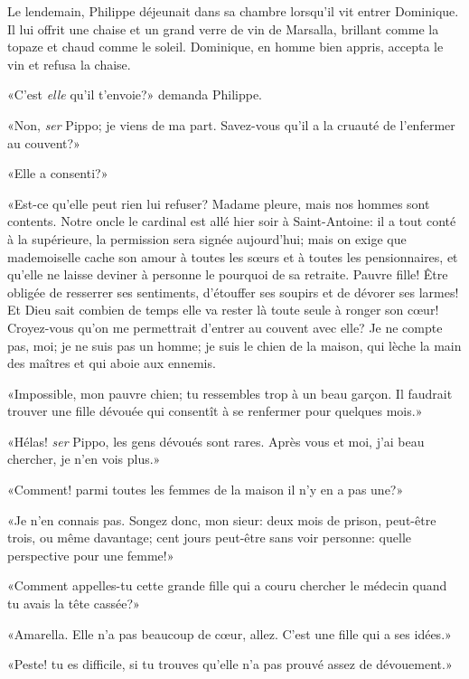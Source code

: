 Le lendemain, Philippe déjeunait dans sa chambre lorsqu'il vit entrer Dominique. Il lui offrit une chaise et un grand verre de vin de Marsalla, brillant comme la topaze et chaud comme le soleil. Dominique, en homme bien appris, accepta le vin et refusa la chaise.

«C'est \emph{elle} qu'il t'envoie?» demanda Philippe.

«Non, \emph{ser} Pippo; je viens de ma part. Savez-vous qu'il a la cruauté de l'enfermer au couvent?»

«Elle a consenti?»

«Est-ce qu'elle peut rien lui refuser? Madame pleure, mais nos hommes sont contents. Notre oncle le cardinal est allé hier soir à Saint-Antoine: il a tout conté à la supérieure, la permission sera signée aujourd'hui; mais on exige que mademoiselle cache son amour à toutes les s\oe{}urs et à toutes les pensionnaires, et qu'elle ne laisse deviner à personne le pourquoi de sa retraite. Pauvre fille! Être obligée de resserrer ses sentiments, d'étouffer ses soupirs et de dévorer ses larmes! Et Dieu sait combien de temps elle va rester là toute seule à ronger son c\oe{}ur! Croyez-vous qu'on me permettrait d'entrer au couvent avec elle? Je ne compte pas, moi; je ne suis pas un homme; je suis le chien de la maison, qui lèche la main des maîtres et qui aboie aux ennemis.

«Impossible, mon pauvre chien; tu ressembles trop à un beau garçon. Il faudrait trouver une fille dévouée qui consentît à se renfermer pour quelques mois.»

«Hélas! \emph{ser} Pippo, les gens dévoués sont rares. Après vous et moi, j'ai beau chercher, je n'en vois plus.»

«Comment! parmi toutes les femmes de la maison il n'y en a pas une?»

«Je n'en connais pas. Songez donc, mon sieur: deux mois de prison, peut-être trois, ou même davantage; cent jours peut-être sans voir personne: quelle perspective pour une femme!»

\enlargethispage{\baselineskip}

«Comment appelles-tu cette grande fille qui a couru chercher le médecin quand tu avais la tête cassée?»

«Amarella. Elle n'a pas beaucoup de c\oe{}ur, allez. C'est une fille qui a ses idées.»

«Peste! tu es difficile, si tu trouves qu'elle n'a pas prouvé assez de dévouement.»

\enlargethispage{\baselineskip}

